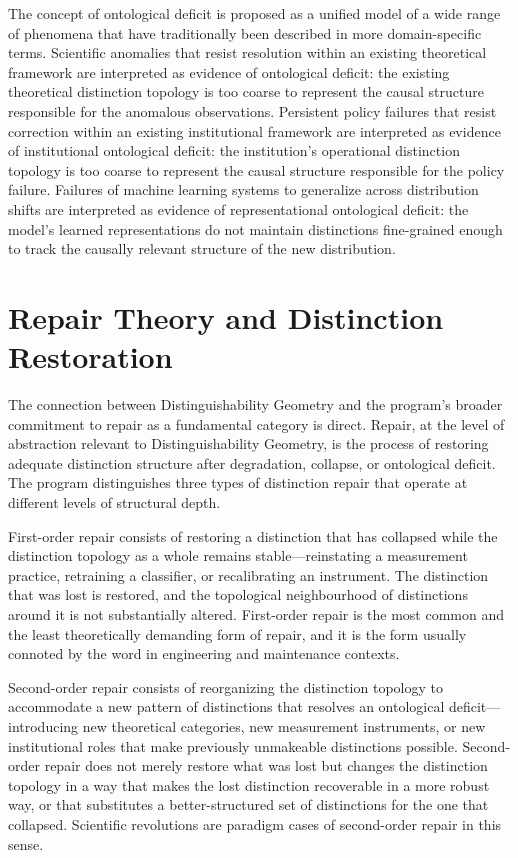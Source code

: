\documentclass[11pt, oneside]{book}
\theoremstyle{definition}
\theoremstyle{remark}
\begin{document}
The concept of ontological deficit is proposed as a unified model of a wide range of phenomena that have traditionally been described in more domain-specific terms. Scientific anomalies that resist resolution within an existing theoretical framework are interpreted as evidence of ontological deficit: the existing theoretical distinction topology is too coarse to represent the causal structure responsible for the anomalous observations. Persistent policy failures that resist correction within an existing institutional framework are interpreted as evidence of institutional ontological deficit: the institution's operational distinction topology is too coarse to represent the causal structure responsible for the policy failure. Failures of machine learning systems to generalize across distribution shifts are interpreted as evidence of representational ontological deficit: the model's learned representations do not maintain distinctions fine-grained enough to track the causally relevant structure of the new distribution.

\section{Repair Theory and Distinction Restoration}

The connection between Distinguishability Geometry and the program's broader commitment to repair as a fundamental category is direct. Repair, at the level of abstraction relevant to Distinguishability Geometry, is the process of restoring adequate distinction structure after degradation, collapse, or ontological deficit. The program distinguishes three types of distinction repair that operate at different levels of structural depth.

First-order repair consists of restoring a distinction that has collapsed while the distinction topology as a whole remains stable—reinstating a measurement practice, retraining a classifier, or recalibrating an instrument. The distinction that was lost is restored, and the topological neighbourhood of distinctions around it is not substantially altered. First-order repair is the most common and the least theoretically demanding form of repair, and it is the form usually connoted by the word in engineering and maintenance contexts.

Second-order repair consists of reorganizing the distinction topology to accommodate a new pattern of distinctions that resolves an ontological deficit—introducing new theoretical categories, new measurement instruments, or new institutional roles that make previously unmakeable distinctions possible. Second-order repair does not merely restore what was lost but changes the distinction topology in a way that makes the lost distinction recoverable in a more robust way, or that substitutes a better-structured set of distinctions for the one that collapsed. Scientific revolutions are paradigm cases of second-order repair in this sense.
\end{document}
